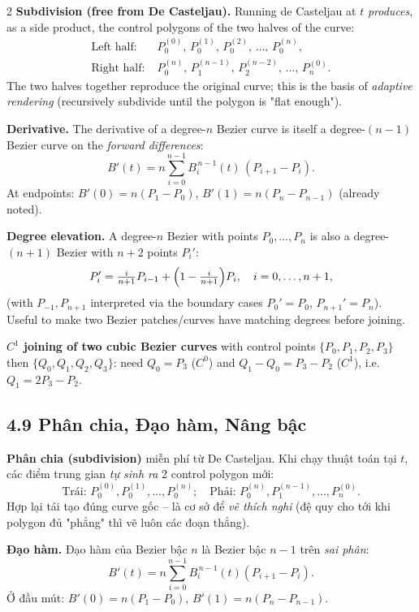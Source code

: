 \begin{paracol}{2}
\textbf{Subdivision (free from De Casteljau).} Running de Casteljau at $t$ \emph{produces}, as a side product, the control polygons of the two halves of the curve:
\begin{align*}
\text{Left half:}\;& P_0^{(0)},\,P_0^{(1)},\,P_0^{(2)},\,\dots,\,P_0^{(n)},\\
\text{Right half:}\;& P_0^{(n)},\,P_1^{(n-1)},\,P_2^{(n-2)},\,\dots,\,P_n^{(0)}.
\end{align*}
The two halves together reproduce the original curve; this is the basis of \emph{adaptive rendering} (recursively subdivide until the polygon is "flat enough").

\textbf{Derivative.} The derivative of a degree-$n$ Bezier curve is itself a degree-$(n{-}1)$ Bezier curve on the \emph{forward differences}:
\[
B'(t)=n\sum_{i=0}^{n-1}B_i^{\,n-1}(t)\,(P_{i+1}-P_i).
\]
At endpoints: $B'(0)=n(P_1-P_0)$, $B'(1)=n(P_n-P_{n-1})$ (already noted).

\textbf{Degree elevation.} A degree-$n$ Bezier with points $P_0,\dots,P_n$ is also a degree-$(n{+}1)$ Bezier with $n{+}2$ points $P_i'$:
\[
P_i'=\tfrac{i}{n+1}P_{i-1}+\Bigl(1-\tfrac{i}{n+1}\Bigr)P_i,\quad i=0,\dots,n+1,
\]
(with $P_{-1}, P_{n+1}$ interpreted via the boundary cases $P_0'=P_0$, $P_{n+1}'=P_n$). Useful to make two Bezier patches/curves have matching degrees before joining.

\textbf{$C^1$ joining of two cubic Bezier curves} with control points $\{P_0,P_1,P_2,P_3\}$ then $\{Q_0,Q_1,Q_2,Q_3\}$:
need $Q_0=P_3$ ($C^0$) and $Q_1-Q_0 = P_3-P_2$ ($C^1$), i.e.\ $Q_1=2P_3-P_2$.

\switchcolumn

\subsection*{4.9 Phân chia, Đạo hàm, Nâng bậc}

\textbf{Phân chia (subdivision)} miễn phí từ De Casteljau. Khi chạy thuật toán tại $t$, các điểm trung gian \emph{tự sinh ra} 2 control polygon mới:
\[
\text{Trái: } P_0^{(0)},P_0^{(1)},\dots,P_0^{(n)};\quad
\text{Phải: } P_0^{(n)},P_1^{(n-1)},\dots,P_n^{(0)}.
\]
Hợp lại tái tạo đúng curve gốc -- là cơ sở để \emph{vẽ thích nghi} (đệ quy cho tới khi polygon đủ "phẳng" thì vẽ luôn các đoạn thẳng).

\textbf{Đạo hàm.} Đạo hàm của Bezier bậc $n$ là Bezier bậc $n{-}1$ trên \emph{sai phân}:
\[
B'(t)=n\sum_{i=0}^{n-1}B_i^{\,n-1}(t)(P_{i+1}-P_i).
\]
Ở đầu mút: $B'(0)=n(P_1-P_0)$, $B'(1)=n(P_n-P_{n-1})$.


\end{paracol}
